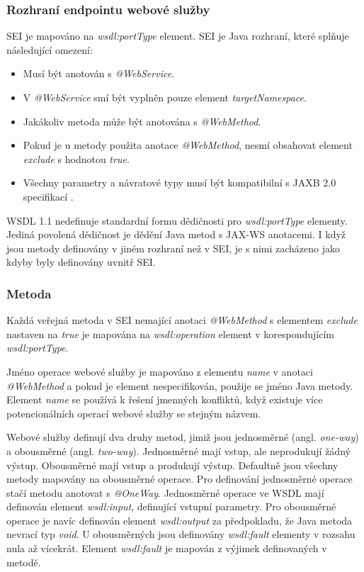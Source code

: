 \documentclass[11pt,twoside,a4paper]{book}
\begin{document}
\subsubsection{Rozhraní endpointu webové služby}
SEI je mapováno na {\em wsdl:portType} element. SEI je Java
rozhraní, které splňuje následující omezení:

\begin{itemize}
  \item Musí být anotován s {\em @WebService}.
  \item V {\em @WebService} smí být vyplněn pouze element {\em targetNamespace}.
  \item Jakákoliv metoda může být anotována s {\em @WebMethod}.
  \item Pokud je u metody použita anotace {\em @WebMethod}, nesmí obsahovat
  element {\em exclude} s hodnotou {\em true}.
  \item Všechny parametry a návratové typy musí být kompatibilní s JAXB 2.0
  specifikací \cite{JAXB20}.
\end{itemize}

WSDL 1.1 nedefinuje standardní formu dědičnosti pro {\em wsdl:portType}
elementy.
Jediná povolená dědičnost je dědění Java metod s JAX-WS anotacemi. I když jsou metody
definovány v jiném rozhraní než v SEI, je s nimi zacházeno jako kdyby byly
definovány uvnitř SEI.

\subsubsection{Metoda}

Každá veřejná metoda v SEI nemající anotaci {\em @WebMethod} s elementem {\em
exclude} nastaven na {\em true} je mapována na {\em wsdl:operation} element v
korespondujícím {\em wsdl:portType}.

Jméno operace webové služby je mapováno z elementu {\em name} v anotaci {\em
@WebMethod} a pokud je element nespecifikován, použije se jméno Java metody.
Element {\em name} se používá k řešení jmenných konfliktů, když existuje více
potencionálních operací webové služby se stejným
názvem.

Webové služby definují dva druhy metod, jimiž jsou jednosměrné (angl. {\em
one-way}) a obousměrné (angl. {\em two-way}).
Jednosměrné mají vstup, ale neprodukují žádný výstup. Obousměrné mají vstup a
produkují výstup. Defaultně jsou všechny metody mapovány na obousměrné operace.
Pro definování jednosměrné operace stačí metodu anotovat s {\em @OneWay}.
Jednosměrné operace ve WSDL mají definován element {\em wsdl:input},
definující vstupní parametry. Pro obousměrné operace je navíc definován
element {\em wsdl:output} za předpokladu, že Java metoda nevrací typ {\em void}.
U obousměrných jsou definovány {\em wsdl:fault} elementy v rozsahu nula až
vícekrát.
Element {\em wsdl:fault} je mapován z výjimek definovaných v metodě.
\end{document}
